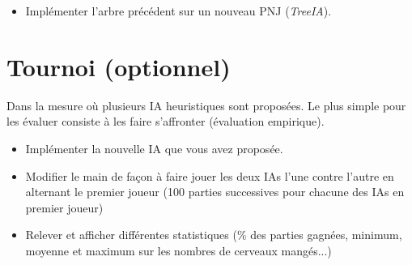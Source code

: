 \documentclass[a4paper, 10pt]{article}
\begin{document}
\begin{itemize}[$\bigcirc$]
\begin{lstlisting}[caption={Votre Arbre de Decision}]
.
\end{lstlisting}

\item Implémenter l'arbre précédent sur un nouveau PNJ (\emph{TreeIA}).

\end{itemize}

\section{Tournoi (optionnel)}

  Dans la mesure où plusieurs IA heuristiques sont proposées. Le plus simple pour les évaluer consiste à les faire s'affronter (évaluation empirique).

  \begin{itemize}[$\bigcirc$]

   \item Implémenter la nouvelle IA que vous avez proposée.

   \item Modifier le main de façon à faire jouer les deux IAs l'une contre l'autre en alternant le premier joueur (100 parties successives pour chacune des IAs en premier joueur)

   \item Relever et afficher différentes statistiques (\% des parties gagnées, minimum, moyenne et maximum sur les nombres de cerveaux mangés...)

  \end{itemize}
\end{document}
